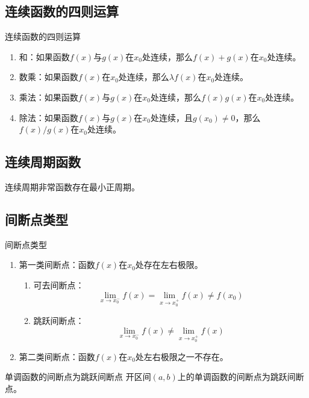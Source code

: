 \documentclass[lang = cn, scheme = chinese, thmcnt = section]{elegantbook}
\begin{document}
\subsection{连续函数的四则运算}

\begin{proposition}{连续函数的四则运算}
	\begin{enumerate}
		\item 和：如果函数$f(x)$与$g(x)$在$x_0$处连续，那么$f(x)+g(x)$在$x_0$处连续。
		\item 数乘：如果函数$f(x)$在$x_0$处连续，那么$\lambda f(x)$在$x_0$处连续。
		\item 乘法：如果函数$f(x)$与$g(x)$在$x_0$处连续，那么$f(x)g(x)$在$x_0$处连续。
		\item 除法：如果函数$f(x)$与$g(x)$在$x_0$处连续，且$g(x_0)\ne 0$，那么$f(x)/g(x)$在$x_0$处连续。
	\end{enumerate}
\end{proposition}

\subsection{连续周期函数}

\begin{theorem}
	连续周期非常函数存在最小正周期。
\end{theorem}

\subsection{间断点类型}

\begin{definition}{间断点类型}
	\begin{enumerate}
		\item 第一类间断点：函数$f(x)$在$x_0$处存在左右极限。
		\begin{enumerate}
			\item 可去间断点：
			$$
			\lim_{x\to x_0^-}f(x)
			=\lim_{x\to x_0^+}f(x)
			\ne f(x_0)
			$$
			\item 跳跃间断点：
			$$
			\lim_{x\to x_0^-}f(x)
			\ne \lim_{x\to x_0^+}f(x)
			$$
		\end{enumerate}
		\item 第二类间断点：函数$f(x)$在$x_0$处左右极限之一不存在。
	\end{enumerate}
\end{definition}

\begin{theorem}{单调函数的间断点为跳跃间断点}
	开区间$(a,b)$上的单调函数的间断点为跳跃间断点。
\end{theorem}
\end{document}
